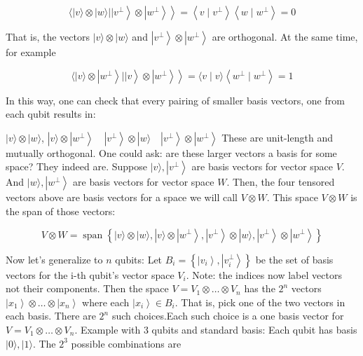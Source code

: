 \documentclass[main.tex]{subfiles}
\begin{document}
    $$
    \left.\left.\langle\mid v\rangle \otimes|w\rangle|| v^{\perp}\right\rangle \otimes\left|w^{\perp}\right\rangle\right\rangle=\left\langle v \mid v^{\perp}\right\rangle\left\langle w \mid w^{\perp}\right\rangle=0
    $$
    
    That is, the vectors $|v\rangle \otimes|w\rangle$ and $\left|v^{\perp}\right\rangle \otimes\left|w^{\perp}\right\rangle$ are orthogonal. At the same time, for example
    
    $$
    \left.\left.\langle\mid v\rangle \otimes\left|w^{\perp}\right\rangle|| v\right\rangle \otimes\left|w^{\perp}\right\rangle\right\rangle=\langle v \mid v\rangle\left\langle w^{\perp} \mid w^{\perp}\right\rangle=1
    $$
    
    In this way, one can check that every pairing of smaller basis vectors, one from each qubit results in:
    
    $|v\rangle \otimes|w\rangle$, $|v\rangle \otimes\left|w^{\perp}\right\rangle \quad\left|v^{\perp}\right\rangle \otimes|w\rangle \quad\left|v^{\perp}\right\rangle \otimes\left|w^{\perp}\right\rangle$ These are unit-length and mutually orthogonal. One could ask: are these larger vectors a basis for some space? They indeed are. Suppose $|v\rangle,\left|v^{\perp}\right\rangle$ are basis vectors for vector space $V$. And $|w\rangle,\left|w^{\perp}\right\rangle$ are basis vectors for vector space $W$. Then, the four tensored vectors above are basis vectors for a space we will call $V \otimes W$. This space $V \otimes W$ is the span of those vectors:
    
    $$
    V \otimes W=\operatorname{span}\left\{|v\rangle \otimes|w\rangle,|v\rangle \otimes\left|w^{\perp}\right\rangle,\left|v^{\perp}\right\rangle \otimes|w\rangle,\left|v^{\perp}\right\rangle \otimes\left|w^{\perp}\right\rangle\right\}
    $$
    
    Now let's generalize to $n$ qubits: Let $B_{i}=\left\{\left|v_{i}\right\rangle,\left|v_{i}^{\perp}\right\rangle\right\}$ be the set of basis vectors for the i-th qubit's vector space $V_{i}$. Note: the indices now label vectors not their components. Then the space $V=V_{1} \otimes \ldots \otimes V_{n}$ has the $2^{n}$ vectors $\left|x_{1}\right\rangle \otimes \ldots \otimes\left|x_{n}\right\rangle$ where each $\left|x_{i}\right\rangle \in B_{i}$. That is, pick one of the two vectors in each basis. There are $2^{n}$ such choices.Each such choice is a one basis vector for $V=V_{1} \otimes \ldots \otimes V_{n}$. Example with 3 qubits and standard basis: Each qubit has basis $|0\rangle,|1\rangle$. The $2^{3}$ possible combinations are
    
\end{document}
